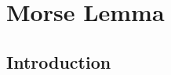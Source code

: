 \chapter{Morse Lemma}
\label{chap:MorseLemma}

\section{Introduction}
\label{sec:MorseLemma_introduction}


\begin{definition}
    \label{def:quadratic form}
    \leanok

  \end{definition}
  